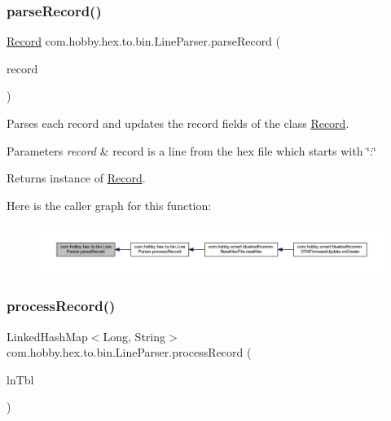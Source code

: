 \subsubsection{\texorpdfstring{parse\+Record()}{parseRecord()}}
{\footnotesize\ttfamily \hyperlink{classcom_1_1hobby_1_1hex_1_1to_1_1bin_1_1_record}{Record} com.\+hobby.\+hex.\+to.\+bin.\+Line\+Parser.\+parse\+Record (\begin{DoxyParamCaption}\item[{String}]{record }\end{DoxyParamCaption})}

Parses each record and updates the record fields of the class \hyperlink{classcom_1_1hobby_1_1hex_1_1to_1_1bin_1_1_record}{Record}.


\begin{DoxyParams}{Parameters}
{\em record} & record is a line from the hex file which starts with \char`\"{}\+:\char`\"{}\\
\hline
\end{DoxyParams}
\begin{DoxyReturn}{Returns}
instance of \hyperlink{classcom_1_1hobby_1_1hex_1_1to_1_1bin_1_1_record}{Record}. 
\end{DoxyReturn}
Here is the caller graph for this function\+:\nopagebreak
\begin{figure}[H]
\begin{center}
\leavevmode
\includegraphics[width=350pt]{classcom_1_1hobby_1_1hex_1_1to_1_1bin_1_1_line_parser_a1c5410cda3414d551d912fe5821c9f85_icgraph}
\end{center}
\end{figure}
\mbox{\label{classcom_1_1hobby_1_1hex_1_1to_1_1bin_1_1_line_parser_acfc2f3e7d365d31f5e7603a4e86c4671}} 
\subsubsection{\texorpdfstring{process\+Record()}{processRecord()}}
{\footnotesize\ttfamily Linked\+Hash\+Map$<$Long, String$>$ com.\+hobby.\+hex.\+to.\+bin.\+Line\+Parser.\+process\+Record (\begin{DoxyParamCaption}\item[{Linked\+Hash\+Map$<$ Integer, String $>$}]{ln\+Tbl }\end{DoxyParamCaption})}


